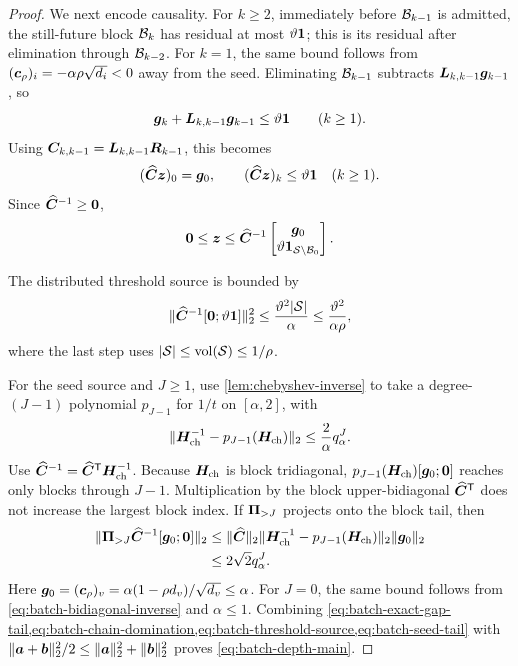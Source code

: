 \begin{proof}
We next encode causality.  For $k\geq2$, immediately before $\mathcal{B}_{k-1}$ is
admitted, the still-future block $\mathcal{B}_k$ has residual at most
$\vartheta\mathbf{1}$; this is its residual after elimination through $\mathcal{B}_{k-2}$.
For $k=1$, the same bound follows from
$(\bm{c}_\rho)_i=-\alpha\rho\sqrt{d_i}<0$ away from the seed.  Eliminating
$\mathcal{B}_{k-1}$ subtracts $\bm{L}_{k,k-1}\bm{g}_{k-1}$, so
\begin{equation*}
 \bm{g}_k+\bm{L}_{k,k-1}\bm{g}_{k-1}\leq\vartheta\mathbf{1}
 \qquad(k\geq1).
\end{equation*}
Using
$\bm{C}_{k,k-1}=\bm{L}_{k,k-1}\bm{R}_{k-1}$, this becomes
\begin{equation*}
 (\widehat{\bm{C}}\bm{z})_0=\bm{g}_0,
 \qquad
 (\widehat{\bm{C}}\bm{z})_k\leq\vartheta\mathbf{1}\quad(k\geq1).
\end{equation*}
Since $\widehat{\bm{C}}^{-1}\geq\bm{0}$,
\begin{equation}
 \bm{0}\leq\bm{z}\leq
 \widehat{\bm{C}}^{-1}
 \begin{bmatrix}\bm{g}_0\\ \vartheta\mathbf{1}_{\mathcal{S}\setminus \mathcal{B}_0}\end{bmatrix}.
 \label{eq:batch-chain-domination}
\end{equation}

The distributed threshold source is bounded by
\begin{equation}
 \lVert\widehat{\bm{C}}^{-1}[\bm{0};\vartheta\mathbf{1}]\rVert_2^2
 \leq\frac{\vartheta^2|\mathcal{S}|}{\alpha}
 \leq\frac{\vartheta^2}{\alpha\rho},
 \label{eq:batch-threshold-source}
\end{equation}
where the last step uses
$|\mathcal{S}|\leq\operatorname{vol}(\mathcal{S})\leq1/\rho$.

For the seed source and $J\geq1$, use \cref{lem:chebyshev-inverse} to take a
degree-$(J-1)$ polynomial
$p_{J-1}$ for $1/t$ on $[\alpha,2]$, with
\begin{equation*}
 \lVert\bm{H}_{\mathrm{ch}}^{-1}-p_{J-1}(\bm{H}_{\mathrm{ch}})\rVert_2
 \leq\frac2\alpha q_\alpha^J.
\end{equation*}
Use $\widehat{\bm{C}}^{-1}=\widehat{\bm{C}}^{\mathsf{T}}\bm{H}_{\mathrm{ch}}^{-1}$.
Because $\bm{H}_{\mathrm{ch}}$ is block tridiagonal,
$p_{J-1}(\bm{H}_{\mathrm{ch}})[\bm{g}_0;\bm{0}]$ reaches only blocks through
$J-1$. Multiplication by the block upper-bidiagonal
$\widehat{\bm{C}}^{\mathsf{T}}$ does not increase the largest block index.  If
$\bm{\Pi}_{>J}$ projects onto the block tail, then
\begin{align}
 \lVert\bm{\Pi}_{>J}\widehat{\bm{C}}^{-1}[\bm{g}_0;\bm{0}]\rVert_2
 &\leq\lVert\widehat{\bm{C}}\rVert_2
       \lVert\bm{H}_{\mathrm{ch}}^{-1}-p_{J-1}(\bm{H}_{\mathrm{ch}})\rVert_2
       \lVert\bm{g}_0\rVert_2\notag\\
 &\leq2\sqrt2q_\alpha^J.
 \label{eq:batch-seed-tail}
\end{align}
Here
$\bm{g}_0=(\bm{c}_\rho)_v=\alpha(1-\rho d_v)/\sqrt{d_v}\leq\alpha$.
For $J=0$, the same bound follows from
\cref{eq:batch-bidiagonal-inverse} and $\alpha\leq1$.
Combining
\cref{eq:batch-exact-gap-tail,eq:batch-chain-domination,eq:batch-threshold-source,eq:batch-seed-tail}
with $\lVert\bm{a}+\bm{b}\rVert_2^2/2\leq\lVert\bm{a}\rVert_2^2+\lVert\bm{b}\rVert_2^2$ proves
\cref{eq:batch-depth-main}.
\end{proof}

